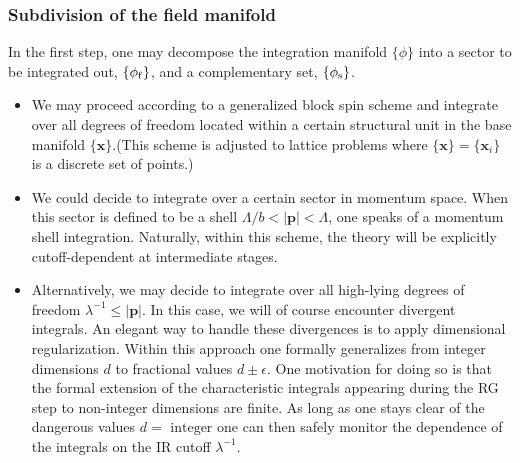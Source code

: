 \subsubsection{Subdivision of the field manifold}
In the first step, one may decompose the integration manifold $\{\phi\}$ into a sector to be integrated out, $\{\phi_{\rm f}\}$, and a complementary set, $\{\phi_{\rm s}\}$.
\begin{itemize}
\item We may proceed according to a generalized block spin scheme and integrate over all degrees of freedom located within a certain structural unit in the base manifold $\{\bm{x}\}$.(This scheme is adjusted to lattice problems where $\{\bm{x}\} = \{\bm{x}_i\}$ is a discrete set of points.)
\item We could decide to integrate over a certain sector in momentum space. When this sector is defined to be a shell $\Lambda /b < |\bm{p}| < \Lambda$, one speaks of a momentum shell integration. Naturally, within this scheme, the theory will be explicitly cutoff-dependent at intermediate stages.
\item Alternatively, we may decide to integrate over all high-lying degrees of freedom $\lambda^{-1} \leq |\bm{p}|$.
In this case, we will of course encounter divergent integrals. An elegant way to handle these divergences is to apply dimensional regularization. Within this approach one formally generalizes from integer dimensions $d$ to fractional values $d \pm \epsilon$. 
One motivation for doing so is that the formal extension of the characteristic integrals appearing during the RG step to non-integer dimensions are finite. As long as one stays clear of the dangerous values $d = \mbox{ integer}$ one can then safely monitor the dependence of the integrals on the IR cutoff $\lambda^{-1}$.
\end{itemize}

